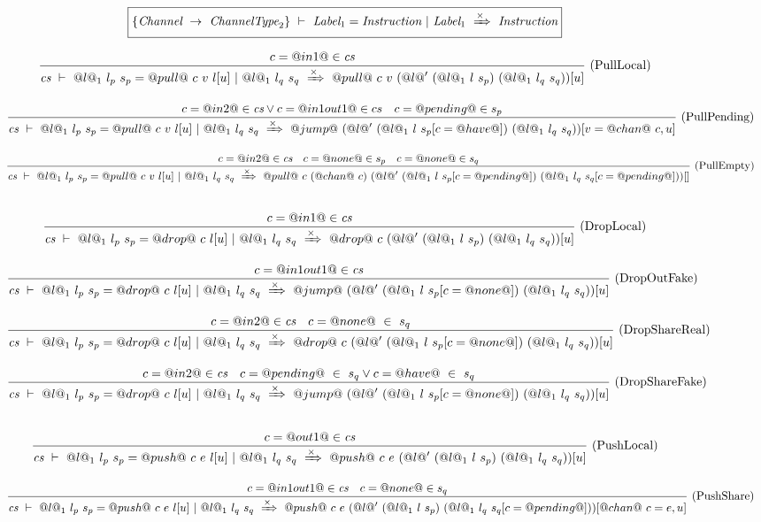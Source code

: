 \begin{figure}

\newcommand\LabelOneC[2]{@l@_1~#1~#2}
\newcommand\LabelCrossC[2]{@l@'~#1~#2}
\newcommand\LabelCrossOnesC[5]{(\LabelCrossC{(\LabelOneC{#1}{#2})}{(\LabelOneC{#3}{#4})})[#5]}
$$
\boxed{\{\textit{Channel} ~\to~ \textit{ChannelType}_2\}~\vdash~\textit{Label}_1=\textit{Instruction}~|~\textit{Label}_1~\xRightarrow{\times}~\textit{Instruction}}
$$

$$
\ruleIN{
  c=@in1@ \in \cs
}{
  \FuseStep{\cs}{\LabelOneC{l_p}{s_p}}{@pull@~c~v~l[u]}{\LabelOneC{l_q}{s_q}}
    {@pull@~c~v~\LabelCrossOnesC{l}{s_p}{l_q}{s_q}{u}}
}{PullLocal}
$$

$$
\ruleIN{
  c=@in2@ \in \cs \vee c=@in1out1@ \in cs
  \quad
  c=@pending@ \in s_p
}{
  \FuseStep{\cs}{\LabelOneC{l_p}{s_p}}{@pull@~c~v~l[u]}{\LabelOneC{l_q}{s_q}}
    {@jump@~\LabelCrossOnesC{l}{s_p[c=@have@]}{l_q}{s_q}{v=@chan@~c,u}}
}{PullPending}
$$

$$
\ruleIN{
  c=@in2@ \in \cs
  \quad
  c=@none@ \in s_p
  \quad
  c=@none@ \in s_q
}{
  \FuseStep{\cs}{\LabelOneC{l_p}{s_p}}{@pull@~c~v~l[u]}{\LabelOneC{l_q}{s_q}}
    {@pull@~c~(@chan@~c)~\LabelCrossOnesC{l}{s_p[c=@pending@]}{l_q}{s_q[c=@pending@]}{}}
}{PullEmpty}
$$

$$
$$

$$
\ruleIN{
  c=@in1@ \in \cs
}{
  \FuseStep{\cs}{\LabelOneC{l_p}{s_p}}{@drop@~c~l[u]}{\LabelOneC{l_q}{s_q}}
    {@drop@~c~\LabelCrossOnesC{l}{s_p}{l_q}{s_q}{u}}
}{DropLocal}
$$

$$
\ruleIN{
  c=@in1out1@ \in \cs
}{
  \FuseStep{\cs}{\LabelOneC{l_p}{s_p}}{@drop@~c~l[u]}{\LabelOneC{l_q}{s_q}}
    {@jump@~\LabelCrossOnesC{l}{s_p[c=@none@]}{l_q}{s_q}{u}}
}{DropOutFake}
$$

$$
\ruleIN{
  c=@in2@ \in \cs
  \quad
  c=@none@~\in~s_q
}{
  \FuseStep{\cs}{\LabelOneC{l_p}{s_p}}{@drop@~c~l[u]}{\LabelOneC{l_q}{s_q}}
    {@drop@~c~\LabelCrossOnesC{l}{s_p[c=@none@]}{l_q}{s_q}{u}}
}{DropShareReal}
$$

$$
\ruleIN{
  c=@in2@ \in \cs
  \quad
  c=@pending@~\in~s_q \vee c=@have@~\in~s_q
}{
  \FuseStep{\cs}{\LabelOneC{l_p}{s_p}}{@drop@~c~l[u]}{\LabelOneC{l_q}{s_q}}
    {@jump@~\LabelCrossOnesC{l}{s_p[c=@none@]}{l_q}{s_q}{u}}
}{DropShareFake}
$$

$$
$$

$$
\ruleIN{
  c=@out1@ \in \cs
}{
  \FuseStep{\cs}{\LabelOneC{l_p}{s_p}}{@push@~c~e~l[u]}{\LabelOneC{l_q}{s_q}}
    {@push@~c~e~\LabelCrossOnesC{l}{s_p}{l_q}{s_q}{u}}
}{PushLocal}
$$

$$
\ruleIN{
  c=@in1out1@ \in \cs
  \quad
  c=@none@ \in s_q
}{
  \FuseStep{\cs}{\LabelOneC{l_p}{s_p}}{@push@~c~e~l[u]}{\LabelOneC{l_q}{s_q}}
    {@push@~c~e~\LabelCrossOnesC{l}{s_p}{l_q}{s_q[c=@pending@]}{@chan@~c=e,u}}
}{PushShare}
$$


\end{figure}
